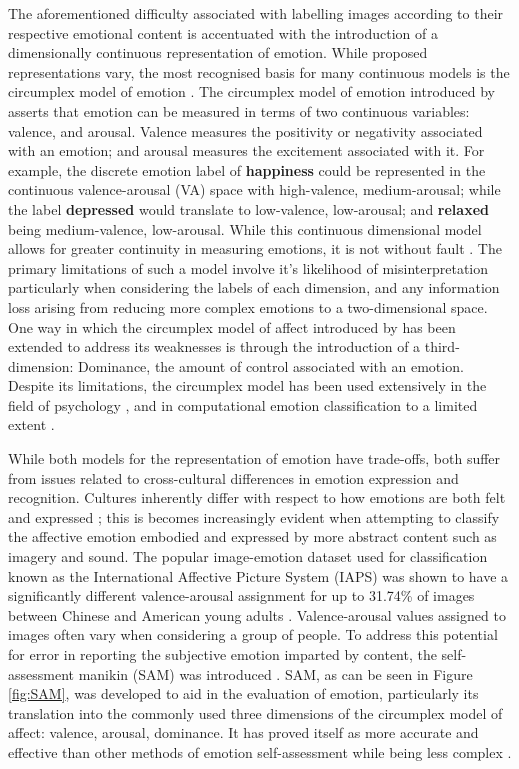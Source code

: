 \documentclass{article}
\begin{document}
The aforementioned difficulty associated with labelling images according to their respective emotional content is accentuated with the introduction of a dimensionally continuous representation of emotion.
While proposed representations vary, the most recognised basis for many continuous models is the circumplex model of emotion \citep{russell1980circumplex}.
The circumplex model of emotion introduced by \citet{russell1980circumplex} asserts that emotion can be measured in terms of two continuous variables: valence, and arousal.
Valence measures the positivity or negativity associated with an emotion; and arousal measures the excitement associated with it.
For example, the discrete emotion label of \textbf{happiness} could be represented in the continuous valence-arousal (VA) space with high-valence, medium-arousal; while the label \textbf{depressed} would translate to low-valence, low-arousal; and \textbf{relaxed} being medium-valence, low-arousal.
While this continuous dimensional model allows for greater continuity in measuring emotions, it is not without fault \citep{larsen1992promises}.
The primary limitations of such a model involve it's likelihood of misinterpretation particularly when considering the labels of each dimension, and any information loss arising from reducing more complex emotions to a two-dimensional space.
One way in which the circumplex model of affect introduced by \citet{russell1980circumplex} has been extended to address its weaknesses is through the introduction of a third-dimension: Dominance, the amount of control associated with an emotion.
Despite its limitations, the circumplex model has been used extensively in the field of psychology \citep{bradley1994measuring,warriner2013norms}, and in computational emotion classification to a limited extent \citep{zhao2016predicting}.

While both models for the representation of emotion have trade-offs, both suffer from issues related to cross-cultural differences in emotion expression and recognition.
Cultures inherently differ with respect to how emotions are both felt and expressed \citep{markus1991culture}; this is becomes increasingly evident when attempting to classify the affective emotion embodied and expressed by more abstract content such as imagery and sound.
The popular image-emotion dataset used for classification known as the International Affective Picture System (IAPS) was shown to have a significantly different valence-arousal assignment for up to 31.74\% of images between Chinese and American young adults \citep{huang2015affective}.
Valence-arousal values assigned to images often vary when considering a group of people.
To address this potential for error in reporting the subjective emotion imparted by content, the self-assessment manikin (SAM) was introduced \citep{lang1980behavioral}.
SAM, as can be seen in Figure \ref{fig:SAM}, was developed to aid in the evaluation of emotion, particularly its translation into the commonly used three dimensions of the circumplex model of affect: valence, arousal, dominance.
It has proved itself as more accurate and effective than other methods of emotion self-assessment while being less complex \citep{bradley1994measuring}.
\end{document}
